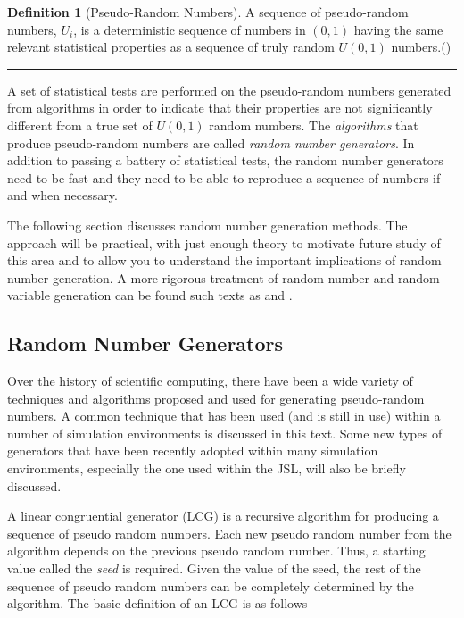 \documentclass[
]{book}
\theoremstyle{definition}
\newtheorem{definition}{Definition}[chapter]
\theoremstyle{definition}
\theoremstyle{definition}
\theoremstyle{definition}
\theoremstyle{remark}
\begin{document}
\begin{definition}[Pseudo-Random Numbers]
\protect\hypertarget{def:PRN}{}{\label{def:PRN} {} }A sequence of pseudo-random numbers, \(U_{i}\), is a deterministic sequence of numbers in \((0,1)\) having the same relevant statistical properties as a sequence of truly
random \(U(0,1)\) numbers.(\citep{ripley1987stochastic})
\end{definition}

\begin{center}\rule{0.5\linewidth}{0.5pt}\end{center}

A set of statistical tests are performed on the pseudo-random numbers
generated from algorithms in order to indicate that their properties are
not significantly different from a true set of \(U(0,1)\) random numbers.
The \emph{algorithms} that produce pseudo-random numbers are called \emph{random number generators}. In addition to passing a battery of statistical tests, the random
number generators need to be fast and they need to be able to reproduce
a sequence of numbers if and when necessary.

The following section discusses random number generation methods. The
approach will be practical, with just enough theory to motivate future
study of this area and to allow you to understand the important
implications of random number generation. A more rigorous treatment of
random number and random variable generation can be found such texts as
\citep{fishman2006first} and \citep{devroye1986nonuniform}.

\hypertarget{app:rnrv:rngs}{%
\subsection{Random Number Generators}\label{app:rnrv:rngs}}

Over the history of scientific computing, there have been a wide variety
of techniques and algorithms proposed and used for generating
pseudo-random numbers. A common technique that has been used (and is
still in use) within a number of simulation environments is discussed in
this text. Some new types of generators that have been recently adopted
within many simulation environments, especially the one used within the
JSL, will also be briefly discussed.

A linear congruential generator (LCG) is a recursive algorithm for
producing a sequence of pseudo random numbers. Each new pseudo random
number from the algorithm depends on the previous pseudo random number.
Thus, a starting value called the \emph{seed} is required. Given the value of
the seed, the rest of the sequence of pseudo random numbers can be
completely determined by the algorithm. The basic definition of an LCG
is as follows
\end{document}
